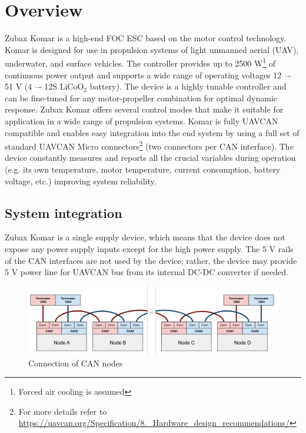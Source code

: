\chapter{Overview}

Zubax Komar is a high-end FOC ESC based on the  motor control technology. 
Komar is designed for use in propulsion systems of light unmanned aerial (UAV), underwater, and surface vehicles. 
The controller provides up to 2500 W\footnote{Forced air cooling is assumed} of continuous power output and supports a wide range of operating voltages 
12 –- 51 V (4 –- 12S $\text{LiCoO}_\text{2}$ battery). 
The device is a highly tunable controller and can be fine-tuned for any motor-propeller combination 
for optimal dynamic response. 
Zubax Komar offers several control modes that make it suitable for application in a wide range of propulsion systems. 
Komar is fully UAVCAN compatible and enables easy integration into the end system by using a full set 
of standard UAVCAN Micro connectors\footnote{For more details refer to 
\url{https://uavcan.org/Specification/8._Hardware_design_recommendations/}} (two connectors per CAN interface).
The device constantly measures and reports all the crucial variables during operation 
(e.g. its own temperature, motor temperature, current consumption, battery voltage, etc.) 
improving system reliability.

\section{System integration}
Zubax Komar is a single supply device, which means that the device does not expose any power supply inputs except 
for the high power supply. The 5 V rails of the CAN interfaces are not used by the device; 
rather, the device may provide 5 V power line for UAVCAN bus from its internal DC-DC converter if needed. 

\begin{figure}[h]
    \centering
    \includegraphics[width=1\textwidth]{figures/can_intergration.png}
    \caption{Connection of CAN nodes}
\end{figure}

